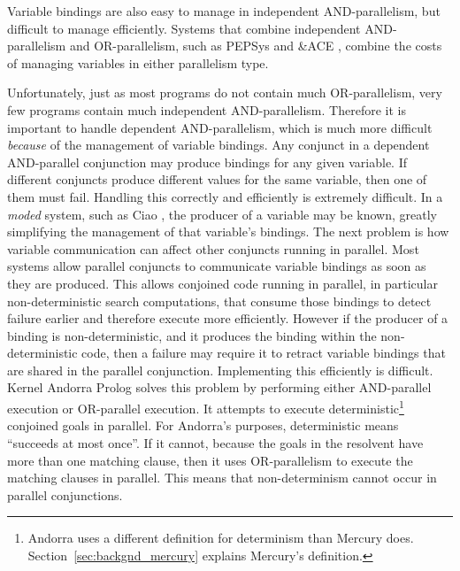 Variable bindings are also easy to manage in independent AND-parallelism,
but difficult to manage efficiently.
Systems that combine independent AND-parallelism and OR-parallelism,
such as 
PEPSys \citep*{baron:1988:pepsys}
and
\&ACE \citep*{gupta:1991:ace},
combine the costs of managing variables in either parallelism type.

Unfortunately,
just as most programs do not contain much OR-parallelism,
very few programs contain much independent AND-parallelism.
Therefore it is important to handle dependent AND-parallelism,
which is much more difficult \emph{because} of the management of variable
bindings.
Any conjunct in a dependent AND-parallel conjunction may produce bindings
for any given variable.
If different conjuncts produce different values for the same variable,
then one of them must fail.
Handling this correctly and efficiently is extremely difficult.
In a \emph{moded} system,
such as Ciao \citep{hermenegildo_ciao},
the producer of a variable may be known,
greatly simplifying the management of that variable's bindings.
The next problem is how variable communication can affect other conjuncts
running in parallel.
Most systems allow parallel conjuncts to communicate variable bindings as
soon as they are produced.
This allows conjoined code running in parallel,
in particular non-deterministic search computations,
that consume those bindings to detect failure earlier and therefore execute
more efficiently.
However if the producer of a binding is non-deterministic,
and it produces the binding within the non-deterministic code,
then a failure may require it to retract variable bindings that are shared
in the parallel conjunction.
Implementing this efficiently is difficult.
Kernel Andorra Prolog \citep*{haridi:1990:andorra}
solves this problem by performing either AND-parallel execution or
OR-parallel execution.
It attempts to execute deterministic\footnote{
    Andorra uses a different definition for determinism than Mercury does.
    Section~\ref{sec:backgnd_mercury} explains Mercury's definition.}
conjoined goals in parallel.
For Andorra's purposes, deterministic means ``succeeds at most once''.
If it cannot,
because the goals in the resolvent have more than one matching clause,
then it uses OR-parallelism to execute the matching clauses in parallel.
This means that non-determinism cannot occur in parallel conjunctions.

